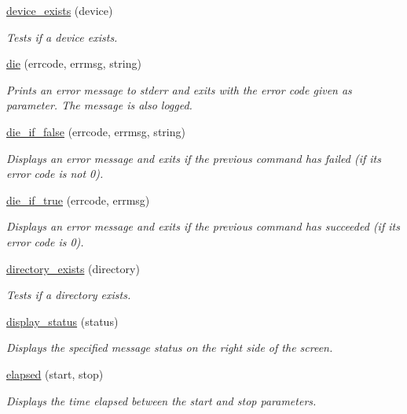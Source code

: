 \begin{DoxyCompactItemize}
\hyperlink{group__file__and__dir_ga8f949ce532087014c53e98a7a2d451ea}{device\+\_\+exists} (device)
\begin{DoxyCompactList}\small\item\em Tests if a device exists. \end{DoxyCompactList}\item 
\hyperlink{group__misc_gad27d9459ccd3e6c812ae0b285e47d7ed}{die} (errcode, errmsg, string)
\begin{DoxyCompactList}\small\item\em Prints an error message to stderr and exits with the error code given as parameter. The message is also logged. \end{DoxyCompactList}\item 
\hyperlink{group__misc_gaee8db3b60325e781e3e3037274e46411}{die\+\_\+if\+\_\+false} (errcode, errmsg, string)
\begin{DoxyCompactList}\small\item\em Displays an error message and exits if the previous command has failed (if its error code is not \textquotesingle{}0\textquotesingle{}). \end{DoxyCompactList}\item 
\hyperlink{group__misc_ga51f5ec17f1a80fdb9b339786645bf9fa}{die\+\_\+if\+\_\+true} (errcode, errmsg)
\begin{DoxyCompactList}\small\item\em Displays an error message and exits if the previous command has succeeded (if its error code is \textquotesingle{}0\textquotesingle{}). \end{DoxyCompactList}\item 
\hyperlink{group__file__and__dir_gaa49f9544909cdab3a323135bbb5a5aff}{directory\+\_\+exists} (directory)
\begin{DoxyCompactList}\small\item\em Tests if a directory exists. \end{DoxyCompactList}\item 
\hyperlink{group__message_ga96f4577ff4b52262f9a0caa7385a354b}{display\+\_\+status} (status)
\begin{DoxyCompactList}\small\item\em Displays the specified message status on the right side of the screen. \end{DoxyCompactList}\item 
\hyperlink{group__time_ga680d052e47a1d2360755d65934ccdf9f}{elapsed} (start, stop)
\begin{DoxyCompactList}\small\item\em Displays the time elapsed between the \textquotesingle{}start\textquotesingle{} and \textquotesingle{}stop\textquotesingle{} parameters. \end{DoxyCompactList}\item 

\end{DoxyCompactItemize}
